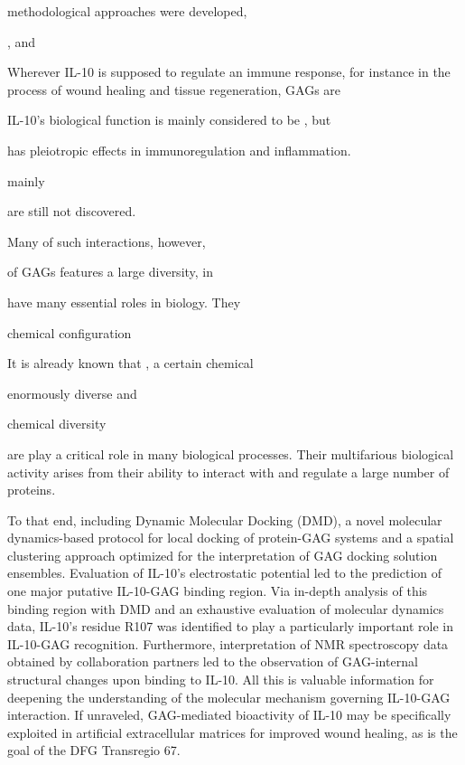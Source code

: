 methodological approaches were developed,

, and



Wherever IL-10 is supposed to
regulate an immune response, for instance in the process of wound healing and
tissue regeneration, GAGs are


 IL-10's biological function is mainly considered to be
, but

 has pleiotropic effects in immunoregulation and
inflammation.




mainly








are still
not discovered.


Many of such interactions, however,




of GAGs features a
large diversity, in


have many essential roles in biology. They

 chemical
configuration


It is already known that , a certain chemical




enormously diverse and

chemical diversity







are play a critical role in many biological processes.
Their multifarious biological activity arises from their ability to interact
with and regulate a large number of proteins.

  To that end, including Dynamic Molecular Docking
(DMD), a novel molecular dynamics-based protocol for local docking of
protein-GAG systems and a spatial clustering approach optimized for the
interpretation of GAG docking solution ensembles. Evaluation of IL-10's
electrostatic potential led to the prediction of one major putative IL-10-GAG
binding region. Via in-depth analysis of this binding region with DMD and an
exhaustive evaluation of molecular dynamics data, IL-10's residue R107 was
identified to play a particularly important role in IL-10-GAG recognition.
Furthermore, interpretation of NMR spectroscopy data obtained by collaboration
partners led to the observation of GAG-internal structural changes upon binding
to IL-10. All this is valuable information for deepening the understanding of
the molecular mechanism governing IL-10-GAG interaction. If unraveled,
GAG-mediated bioactivity of IL-10 may be specifically exploited in artificial
extracellular matrices for improved wound healing, as is the goal of the DFG
Transregio 67.

\lipsum[1-4]